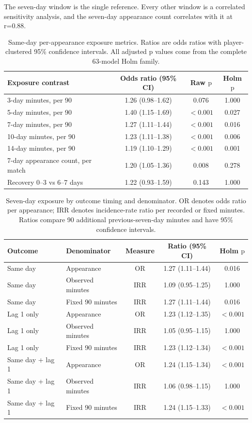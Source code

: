 \documentclass[11pt]{article}
\newcommand{\pval}{\mathrm{p}}
\begin{document}
The seven-day window is the single reference. Every other window is a correlated sensitivity analysis, and the seven-day appearance count correlates with it at r=0.88.

\begin{table}[h]
\centering
\caption{Same-day per-appearance exposure metrics. Ratios are odds ratios with player-clustered 95\% confidence intervals. All adjusted $\pval$ values come from the complete 63-model Holm family.}
\label{tab:supp_metrics}
\small
\begin{tabular}{lccc}
\toprule
Exposure contrast & Odds ratio (95\% CI) & Raw $\pval$ & Holm $\pval$\\
\midrule
3-day minutes, per 90 & 1.26 (0.98--1.62) & 0.076 & 1.000\\
5-day minutes, per 90 & 1.40 (1.15--1.69) & $<0.001$ & 0.027\\
7-day minutes, per 90 & 1.27 (1.11--1.44) & $<0.001$ & 0.016\\
10-day minutes, per 90 & 1.23 (1.11--1.38) & $<0.001$ & 0.006\\
14-day minutes, per 90 & 1.19 (1.10--1.29) & $<0.001$ & 0.001\\
7-day appearance count, per match & 1.20 (1.05--1.36) & 0.008 & 0.278\\
Recovery 0--3 vs 6--7 days & 1.22 (0.93--1.59) & 0.143 & 1.000\\
\bottomrule
\end{tabular}
\end{table}

\begin{table}[h]
\centering
\caption{Seven-day exposure by outcome timing and denominator. OR denotes odds ratio per appearance; IRR denotes incidence-rate ratio per recorded or fixed minutes. Ratios compare 90 additional previous-seven-day minutes and have 95\% confidence intervals.}
\label{tab:supp_timing_denominator}
\small
\begin{tabular}{llccc}
\toprule
Outcome & Denominator & Measure & Ratio (95\% CI) & Holm $\pval$\\
\midrule
Same day & Appearance & OR & 1.27 (1.11--1.44) & 0.016\\
Same day & Observed minutes & IRR & 1.09 (0.95--1.25) & 1.000\\
Same day & Fixed 90 minutes & IRR & 1.27 (1.11--1.44) & 0.016\\
Lag 1 only & Appearance & OR & 1.23 (1.12--1.35) & $<0.001$\\
Lag 1 only & Observed minutes & IRR & 1.05 (0.95--1.15) & 1.000\\
Lag 1 only & Fixed 90 minutes & IRR & 1.23 (1.12--1.34) & $<0.001$\\
Same day + lag 1 & Appearance & OR & 1.24 (1.15--1.34) & $<0.001$\\
Same day + lag 1 & Observed minutes & IRR & 1.06 (0.98--1.15) & 1.000\\
Same day + lag 1 & Fixed 90 minutes & IRR & 1.24 (1.15--1.33) & $<0.001$\\
\bottomrule
\end{tabular}
\end{table}
\end{document}
